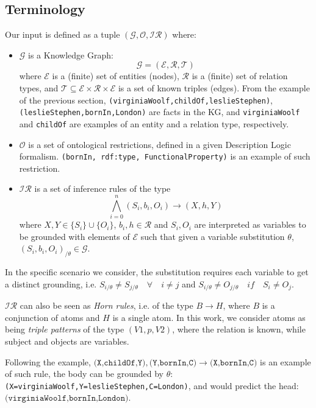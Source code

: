 \documentclass[a4paper,UKenglish,cleveref, autoref, thm-restate]{tgdk-v2021}
\begin{document}
\subsection{Terminology}
Our input is defined as a tuple $(\mathcal{G},\mathcal{O},\mathcal{IR})$ where:
\begin{itemize}
    \item $\mathcal{G}$ is a Knowledge Graph: $$\mathcal{G} = (\mathcal{E}, \mathcal{R}, \mathcal{T})$$ where $\mathcal{E}$ is a (finite) set of entities (nodes), $\mathcal{R}$ is a (finite) set of relation types, and $\mathcal{T} \subseteq \mathcal{E} \times \mathcal{R} \times \mathcal{E}$ is a set of known triples (edges). From the example of the previous section, \texttt{(virginiaWoolf,childOf,leslieStephen)}, \texttt{(leslieStephen,bornIn,London)} are facts in the KG, and \texttt{virginiaWoolf} and \texttt{childOf} are examples of an entity and a relation type, respectively.
    \item $\mathcal{O}$ is a set of ontological restrictions, defined in a given Description Logic formalism. \texttt{(bornIn, rdf:type, FunctionalProperty)} is an example of such restriction.
    \item $\mathcal{IR}$ is a set of inference rules of the type $$\bigwedge_{i=0}^{n} (S_i, b_i, O_i) \rightarrow (X, h , Y)$$ where $X,Y \in \{S_i\}\cup{\{O_i\}}$, $b_i,h \in \mathcal{R}$ and $S_i,O_i$ are interpreted as variables to be grounded with elements of $\mathcal{E}$ such that given a variable substitution $\theta$, $(S_i, b_i, O_i)_{/\theta} \in \mathcal{G}$.     
\end{itemize}
In the specific scenario we consider, the substitution requires each variable to get a distinct grounding, i.e. $S_{i/\theta} \not= S_{j/\theta}\quad\forall \quad i \not=j$ and $S_{i/\theta} \not=O_{j/\theta}\quad if\quad S_i \not=O_j$.

    $\mathcal{IR}$ can also be seen as \textit{Horn rules}, i.e. of the type $B \rightarrow H$, where $B$ is a conjunction of atoms and $H$ is a single atom. In this work, we consider atoms as being \textit{triple patterns} of the type $(V1,p,V2)$, where the relation is known, while subject and objects are variables.

    Following the example, $\texttt{(X,childOf,Y)}, \texttt{(Y,bornIn,C)} \rightarrow \texttt{(X,bornIn,C)}$ is an example of such rule, the body can be grounded by $\theta:$ \texttt{(X=virginiaWoolf,Y=leslieStephen,C=London)}, and would predict the head: $\texttt{(virginiaWoolf,bornIn,London)}$.
\end{document}
